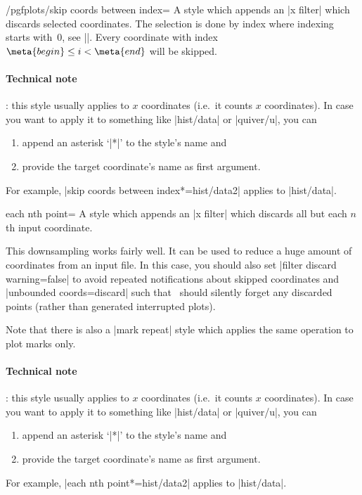 \begin{stylekey}{/pgfplots/skip coords between index=}
	A style which appends an |x filter| which discards selected coordinates. The selection is done by index where indexing starts with~$0$, see |\coordindex|. Every coordinate with index $\meta{begin} \le i < \meta{end}$ will be skipped.
\begin{codeexample}[]
\end{codeexample}

	\paragraph{Technical note}: this style usually applies to $x$ coordinates (i.e.\ it counts $x$ coordinates). In case you want to apply it to something like |hist/data| or |quiver/u|, you can
	\begin{enumerate}
		\item append an asterisk `|*|' to the style's name and
		\item provide the target coordinate's name as first argument.
	\end{enumerate}
	For example, |skip coords between index*={hist/data}{2}| applies to |hist/data|.
\end{stylekey}

\begin{pgfplotskey}{each nth point=}
	A style which appends an |x filter| which discards all but each $n$th input coordinate.

	This downsampling works fairly well. It can be used to reduce a huge amount of coordinates from an input file. In this case, you should also set |filter discard warning=false| to avoid repeated notifications about skipped coordinates and |unbounded coords=discard| such that \PGFPlots\ should silently forget any discarded points (rather than generated interrupted plots).

	Note that there is also a |mark repeat| style which applies the same operation to plot marks only.

	\paragraph{Technical note}: this style usually applies to $x$ coordinates (i.e.\ it counts $x$ coordinates). In case you want to apply it to something like |hist/data| or |quiver/u|, you can
	\begin{enumerate}
		\item append an asterisk `|*|' to the style's name and
		\item provide the target coordinate's name as first argument.
	\end{enumerate}
	For example, |each nth point*={hist/data}{2}| applies to |hist/data|.
\end{pgfplotskey}

